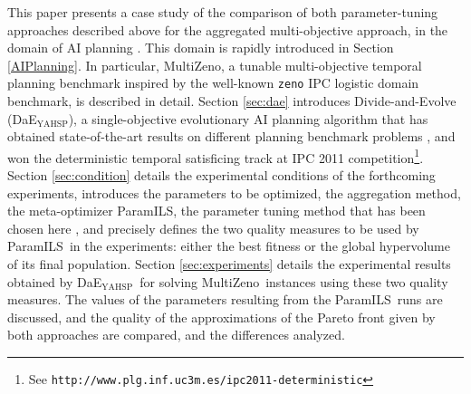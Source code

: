 \documentclass{llncs}
\newcommand{\DAEYAHSP}{{\sc DaE$_{\text{YAHSP}}$}}
\def\MULTIZENO{{\sc MultiZeno}}
\def\PARAMILS{{\sc ParamILS}}
\begin{document}
This paper presents a case study of the comparison of both parameter-tuning approaches described above for the aggregated multi-objective approach, in the domain of AI planning \cite{AIplanningBook2004}. This domain is rapidly introduced in Section \ref{AIPlanning}. In particular, \MULTIZENO, a tunable multi-objective temporal planning benchmark inspired by the well-known {\tt zeno} IPC logistic domain benchmark, is described in detail.
Section \ref{sec:dae} introduces Divide-and-Evolve (\DAEYAHSP), a single-objective evolutionary AI planning algorithm that has obtained state-of-the-art results on different planning benchmark problems \cite{Bibai2010}, and won the deterministic temporal satisficing track at IPC 2011 competition\footnote{See {\tt http://www.plg.inf.uc3m.es/ipc2011-deterministic}}. Section \ref{sec:condition} details the experimental conditions of the forthcoming experiments, introduces the parameters to be optimized, the aggregation method, the meta-optimizer \PARAMILS, the parameter tuning method that has been chosen here \cite{hutter2009paramils}, and precisely defines the two quality measures to be used by \PARAMILS\ in the experiments: either the best fitness or the global hypervolume of its final population. 
Section \ref{sec:experiments} details the experimental results obtained by \DAEYAHSP\ for solving \MULTIZENO\ instances using these two quality measures. The values of the parameters resulting from the \PARAMILS\ runs are discussed, and the quality of the approximations of the Pareto front given by both approaches are compared, and the differences analyzed. %
\end{document}
